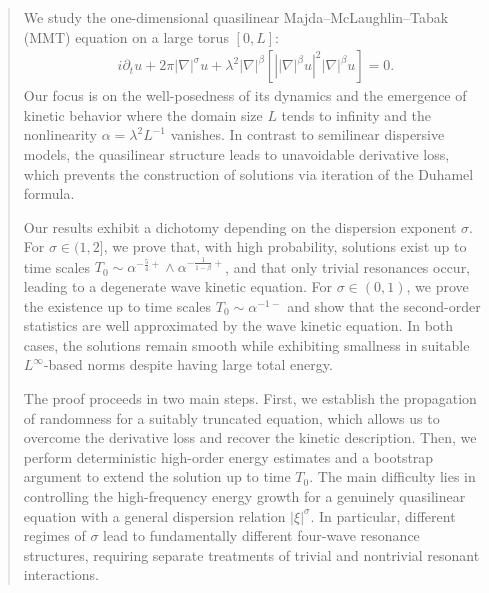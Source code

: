\documentclass[UTF-8,reqno]{amsart}
\numberwithin{equation}{section}
\theoremstyle{definition}
\begin{document}
\begin{abstract}

We study the one-dimensional quasilinear Majda--McLaughlin--Tabak (MMT) equation on a large torus $[0,L]$:
\begin{align*}
    i \partial_t u +2\pi|\nabla|^\sigma u +\lambda^{2}|\nabla|^\beta\left[ \left||\nabla|^\beta u\right|^{2} |\nabla|^\beta u\right]=0.
\end{align*}
Our focus is on the well-posedness of its dynamics and the emergence of kinetic behavior where the domain size $L$ tends to infinity and the nonlinearity $\alpha=\lambda^2L^{-1}$ vanishes. In contrast to semilinear dispersive models, the quasilinear structure leads to unavoidable derivative loss, which prevents the construction of solutions via iteration of the Duhamel formula.  


Our results exhibit a dichotomy depending on the dispersion exponent $\sigma$. For $\sigma\in(1,2]$, we prove that, with high probability, solutions exist up to time scales $T_0 \sim \alpha^{-\frac54+} \wedge \alpha^{-\frac1{1-\beta}+}$, and that only trivial resonances occur, leading to a degenerate wave kinetic equation. For $\sigma\in(0,1)$, we prove the existence up to time scales $T_0 \sim \alpha^{-1-}$ and show that the second-order statistics are well approximated by the wave kinetic equation. In both cases, the solutions remain smooth while exhibiting smallness in suitable $L^\infty$-based norms despite having large total energy.

The proof proceeds in two main steps. First, we establish the
propagation of randomness for a suitably truncated equation, which
allows us to overcome the derivative loss and recover the kinetic
description. Then, we perform deterministic high-order energy estimates
and a bootstrap argument to extend the solution up to time $T_0$. The
main difficulty  lies in controlling the high-frequency
energy growth for a genuinely quasilinear equation with a general
 dispersion relation $|\xi|^\sigma$. In particular, different
regimes of $\sigma$ lead to fundamentally different four-wave resonance
structures, requiring separate treatments of trivial and nontrivial
resonant interactions. 

\end{abstract}



\date{\today}
\end{document}
